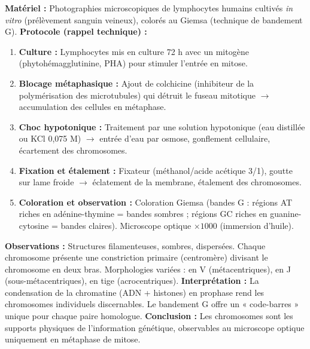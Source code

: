 \documentclass[11pt]{article}
\newcommand{\cle}[1]{{\popxbold\color{popdark}#1}}
\begin{document}
\begin{experience}
\textbf{Matériel :} Photographies microscopiques de lymphocytes humains cultivés \emph{in vitro} (prélèvement sanguin veineux), colorés au Giemsa (technique de bandement G).
\textbf{Protocole (rappel technique) :}
\begin{enumerate}
    \item \textbf{Culture :} Lymphocytes mis en culture 72 h avec un mitogène (phytohémagglutinine, PHA) pour stimuler l'entrée en mitose.
    \item \textbf{Blocage métaphasique :} Ajout de colchicine (inhibiteur de la polymérisation des microtubules) qui détruit le fuseau mitotique $\rightarrow$ accumulation des cellules en métaphase.
    \item \textbf{Choc hypotonique :} Traitement par une solution hypotonique (eau distillée ou KCl 0,075 M) $\rightarrow$ entrée d'eau par osmose, gonflement cellulaire, écartement des chromosomes.
    \item \textbf{Fixation et étalement :} Fixateur (méthanol/acide acétique 3/1), goutte sur lame froide $\rightarrow$ éclatement de la membrane, étalement des chromosomes.
    \item \textbf{Coloration et observation :} Coloration Giemsa (bandes G : régions AT riches en adénine-thymine = bandes sombres ; régions GC riches en guanine-cytosine = bandes claires). Microscope optique $\times 1000$ (immersion d'huile).
\end{enumerate}
\textbf{Observations :} Structures filamenteuses, sombres, dispersées. Chaque chromosome présente une \cle{constriction primaire} (centromère) divisant le chromosome en deux bras. Morphologies variées : en V (métacentriques), en J (sous-métacentriques), en tige (acrocentriques).
\textbf{Interprétation :} La condensation de la chromatine (ADN + histones) en prophase rend les chromosomes individuels discernables. Le bandement G offre un « code-barres » unique pour chaque paire homologue.
\textbf{Conclusion :} Les chromosomes sont les supports physiques de l'information génétique, observables au microscope optique uniquement en métaphase de mitose.
\end{experience}
\end{document}
